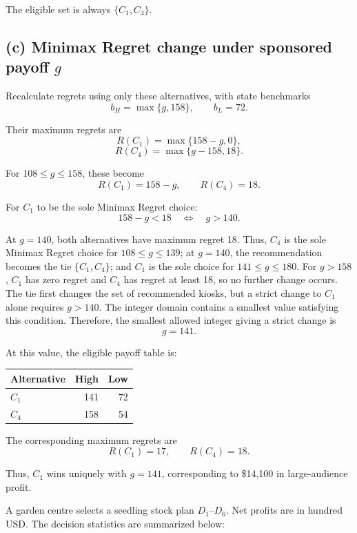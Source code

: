 The eligible set is always $\{C_1,C_4\}$.
\secInicio[sec:q2]

\label{sol:q2c}
\subsection*{(c) Minimax Regret change under sponsored payoff $g$ }

Recalculate regrets using only these alternatives,
with state benchmarks
\[
b_H=\max\{g,158\},\qquad b_L=72.
\]

Their maximum regrets are
\[
R(C_1)=\max\{158-g,0\},
\]
\[
R(C_4)=\max\{g-158,18\}.
\]

For $108\le g\le158$, these become
\[
R(C_1)=158-g,\qquad R(C_4)=18.
\]

For $C_1$ to be the sole Minimax Regret choice:
\[
158-g<18
\quad\Longleftrightarrow\quad g>140.
\]

At $g=140$, both alternatives have maximum regret 18.
Thus, $C_4$ is the sole Minimax Regret choice for $108\le g\le139$;
at $g=140$, the recommendation becomes the tie $\{C_1,C_4\}$;
and $C_1$ is the sole choice for $141\le g\le180$.
For $g>158$, $C_1$ has zero regret and $C_4$ has regret at least 18,
so no further change occurs.
The tie first changes the set of recommended kiosks, but a strict
change to $C_1$ alone requires $g>140$.
The integer domain contains a smallest value satisfying this condition.
Therefore, the smallest allowed integer giving a strict change is
\[
\boxed{g=141}.
\]

At this value, the eligible payoff table is:

\begin{center}\small\setlength{\tabcolsep}{4pt}
\begin{tabular}{lrr}\toprule
Alternative & High & Low\\ \midrule
$C_1$ & 141 & 72\\
$C_4$ & 158 & 54\\
\bottomrule
\end{tabular}
\end{center}

The corresponding maximum regrets are
\[
R(C_1)=17,\qquad R(C_4)=18.
\]

Thus, $C_1$ wins uniquely with $g=141$,
corresponding to \$14,100 in large-audience profit.
\secInicio[sec:q2]



A garden centre selects a seedling stock plan $D_1$--$D_6$. Net profits are in hundred USD. The decision statistics are summarized below:

